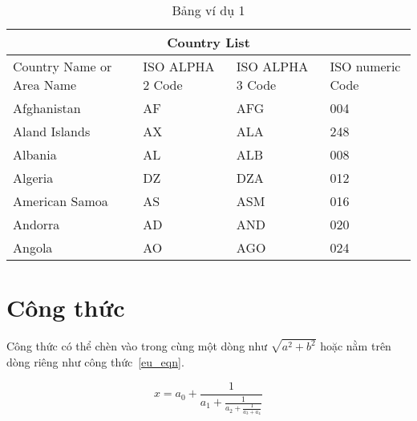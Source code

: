 \begin{table}[ht]
\caption{Bảng ví dụ 1}

\label{tab:vd1}%
\begin{center}
\begin{tabular}{ |p{3cm}||p{3cm}|p{3cm}|p{3cm}|  }
 \hline
 \multicolumn{4}{|c|}{Country List} \\
 \hline
 Country Name     or Area Name& ISO ALPHA 2 Code &ISO ALPHA 3 Code&ISO numeric Code\\
 \hline
 Afghanistan   & AF    &AFG&   004\\
 Aland Islands&   AX  & ALA   &248\\
 Albania &AL & ALB&  008\\
 Algeria    &DZ & DZA&  012\\
 American Samoa&   AS  & ASM&016\\
 Andorra& AD  & AND   &020\\
 Angola& AO  & AGO&024\\
 \hline
\end{tabular}
\end{center}
\end{table}

\section{Công thức}

Công thức có thể chèn vào trong cùng một dòng như $ \sqrt{a^2+b^2} $ hoặc nằm trên dòng riêng như công thức~\ref{eu_eqn}.

\begin{equation} \label{eu_eqn}
x = a_0 + \frac{1}{a_1 + \frac{1}{a_2 + \frac{1}{a_3 + a_4}}}
\end{equation}